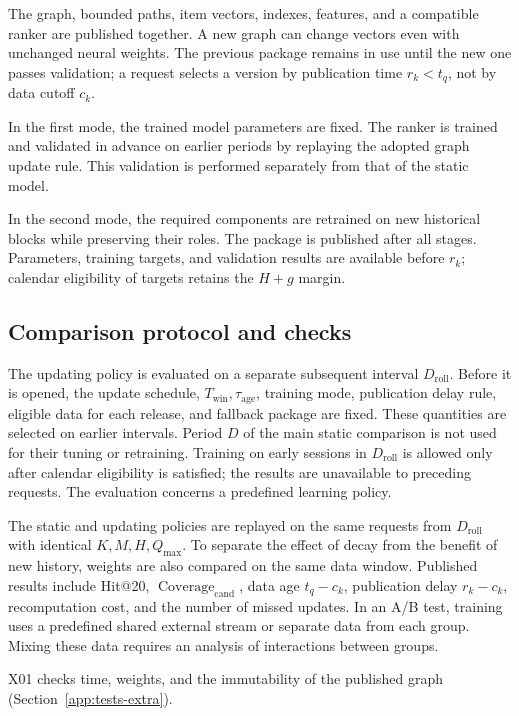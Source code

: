 \documentclass[12pt,a4paper]{article}
\theoremstyle{plainru}
\begin{document}
The graph, bounded paths, item vectors,
indexes, features, and a compatible ranker are published together.
A new graph can change vectors even with unchanged neural weights.
The previous package remains in use until the new one passes validation; a request selects
a version by publication time $r_k<t_q$, not by data cutoff $c_k$.

In the first mode, the trained model parameters are fixed.
The ranker is trained and validated in advance on earlier periods
by replaying the adopted graph update rule.
This validation is performed separately from that of the static model.

In the second mode, the required components are retrained on new
historical blocks while preserving their roles. The package is published after
all stages. Parameters, training targets, and validation results are available
before $r_k$; calendar eligibility of targets retains the $H+g$ margin.

\subsection{Comparison protocol and checks}\label{sec:freshness-evaluation}

The updating policy is evaluated on a separate subsequent interval
$D_{\mathrm{roll}}$. Before it is opened, the update schedule,
$T_{\mathrm{win}},\tau_{\mathrm{age}}$, training mode, publication delay
rule, eligible data for each release, and fallback package are fixed.
These quantities are selected on earlier intervals.
Period $D$ of the main static comparison is not used
for their tuning or retraining.
Training on early sessions in $D_{\mathrm{roll}}$ is allowed only after
calendar eligibility is satisfied; the results are unavailable to preceding requests.
The evaluation concerns a predefined learning policy.

The static and updating policies are replayed on the same
requests from $D_{\mathrm{roll}}$ with identical $K,M,H,Q_{\max}$.
To separate the effect of decay from the benefit of new history, weights
are also compared on the same data window.
Published results include Hit@20, $\operatorname{Coverage}_{\mathrm{cand}}$, data age $t_q-c_k$,
publication delay $r_k-c_k$, recomputation cost, and the number of missed
updates. In an A/B test, training uses a predefined shared external stream
or separate data from each group. Mixing these data requires an analysis
of interactions between groups.

X01 checks time, weights, and the immutability of the published graph
(Section~\ref{app:tests-extra}).
\end{document}
